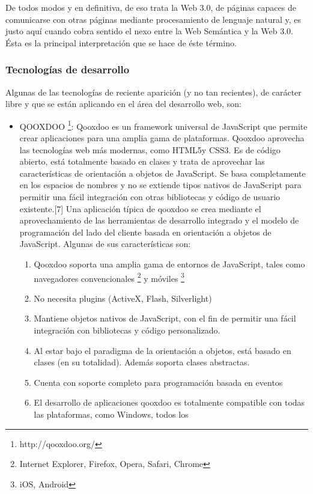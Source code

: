 De todos modos y en definitiva, de eso trata la Web 3.0, de páginas capaces de comunicarse con otras páginas mediante procesamiento 
de lenguaje natural y, es justo aquí cuando cobra sentido el nexo entre la Web Semántica y la Web 3.0. Ésta es la principal interpretación
que se hace de éste término. 

\subsubsection{Tecnologías de desarrollo}

Algunas de las tecnologías de reciente aparición (y no tan recientes), de carácter libre y que se están aplicando en el 
área del desarrollo web, son:

\begin{itemize}
 \item QOOXDOO \footnote{http://qooxdoo.org/}: Qooxdoo es un framework universal de JavaScript que permite crear aplicaciones para 
  una amplia gama de plataformas. Qooxdoo aprovecha las tecnologías web más modernas, como HTML5y CSS3. Es de código abierto,
  está totalmente basado en clases y trata de aprovechar las características de orientación a objetos de JavaScript. 
  Se basa completamente en los espacios de nombres y no se extiende tipos nativos de JavaScript para permitir una fácil integración 
  con otras bibliotecas y código de usuario existente.[7]
  Una aplicación típica de qooxdoo se crea mediante el aprovechamiento de las herramientas de desarrollo integrado y el modelo de 
  programación del lado del cliente basada en orientación a objetos de JavaScript.
  Algunas de sus características son:
   \begin{enumerate}
    \item Qooxdoo soporta una amplia gama de entornos de JavaScript, tales como navegadores convencionales
      \footnote{Internet Explorer, Firefox, Opera, Safari, Chrome} y móviles \footnote{iOS, Android}
    \item No necesita plugins (ActiveX, Flash, Silverlight)
    \item Mantiene objetos nativos de JavaScript, con el fin de permitir una fácil integración con bibliotecas y código personalizado. 
    \item Al estar bajo el paradigma de la orientación a objetos, está basado en clases (en su totalidad). Además soporta
      clases abstractas.
    \item Cuenta con soporte completo para programación basada en eventos
    \item El desarrollo de aplicaciones qooxdoo es totalmente compatible con todas las plataformas, como Windows, todos los 

\end{enumerate}
\end{itemize}
